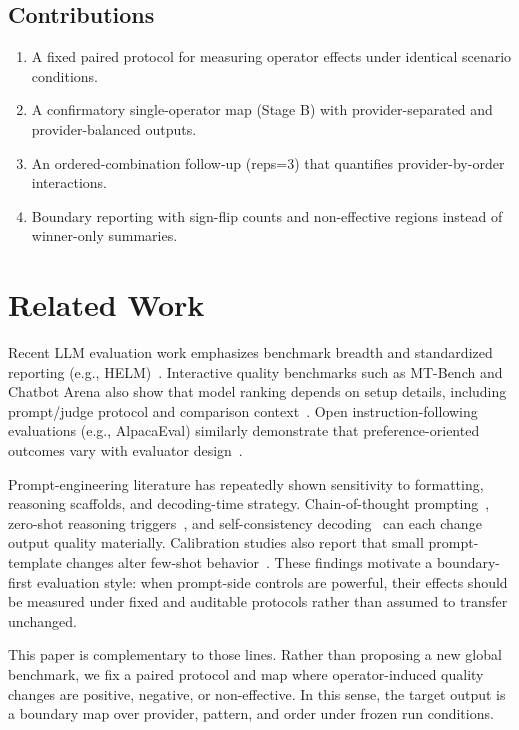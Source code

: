 \documentclass[11pt,a4paper]{article}
\begin{document}
\subsection{Contributions}

\begin{enumerate}
  \item A fixed paired protocol for measuring operator effects under identical scenario conditions.
  \item A confirmatory single-operator map (Stage B) with provider-separated and provider-balanced outputs.
  \item An ordered-combination follow-up (reps=3) that quantifies provider-by-order interactions.
  \item Boundary reporting with sign-flip counts and non-effective regions instead of winner-only summaries.
\end{enumerate}

\section{Related Work}
\label{sec:related}

Recent LLM evaluation work emphasizes benchmark breadth and standardized reporting (e.g., HELM)~\cite{liang2022helm}. Interactive quality benchmarks such as MT-Bench and Chatbot Arena also show that model ranking depends on setup details, including prompt/judge protocol and comparison context~\cite{zheng2023mtbench}. Open instruction-following evaluations (e.g., AlpacaEval) similarly demonstrate that preference-oriented outcomes vary with evaluator design~\cite{dubois2024alpacaeval}.

Prompt-engineering literature has repeatedly shown sensitivity to formatting, reasoning scaffolds, and decoding-time strategy. Chain-of-thought prompting~\cite{wei2022cot}, zero-shot reasoning triggers~\cite{kojima2022zeroshot}, and self-consistency decoding~\cite{wang2023selfconsistency} can each change output quality materially. Calibration studies also report that small prompt-template changes alter few-shot behavior~\cite{zhao2021calibrate}. These findings motivate a boundary-first evaluation style: when prompt-side controls are powerful, their effects should be measured under fixed and auditable protocols rather than assumed to transfer unchanged.

This paper is complementary to those lines. Rather than proposing a new global benchmark, we fix a paired protocol and map where operator-induced quality changes are positive, negative, or non-effective. In this sense, the target output is a boundary map over provider, pattern, and order under frozen run conditions.
\end{document}
